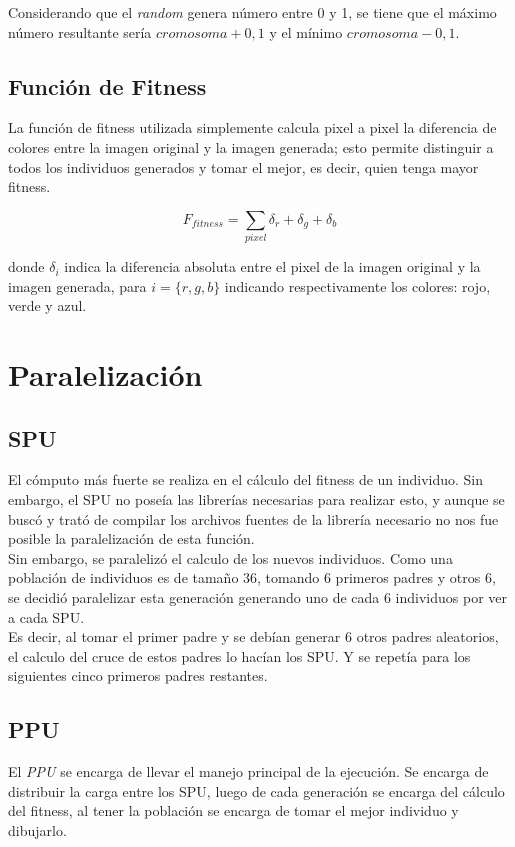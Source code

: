 \documentclass[11pt, spanish]{article}
\begin{document}
Considerando que el \emph{random} genera número entre 0 y 1, se tiene que el máximo número resultante sería $cromosoma + 0,1$ y el mínimo $cromosoma - 0,1$.

\subsection{Función de Fitness}
La función de fitness utilizada simplemente calcula pixel a pixel la diferencia de colores entre la imagen original y la imagen generada; esto permite distinguir a todos los individuos generados y tomar el mejor, es decir, quien tenga mayor fitness.

$$ F_{fitness} = \displaystyle\sum_{pixel} \delta_r + \delta_g + \delta_b $$

donde $\delta_i$ indica la diferencia absoluta entre el pixel de la imagen original y la imagen generada, para $i = \{r, g, b\}$ indicando respectivamente los colores: rojo, verde y azul.

\section{Paralelización}
\subsection{SPU}
El cómputo más fuerte se realiza en el cálculo del fitness de un individuo. Sin embargo, el SPU no poseía las librerías necesarias para realizar esto, y aunque se buscó y trató de compilar los archivos fuentes de la librería necesario no nos fue posible la paralelización de esta función. \\

Sin embargo, se paralelizó el calculo de los nuevos individuos. Como una población de individuos es de tamaño 36, tomando 6 primeros padres y otros 6, se decidió paralelizar esta generación generando uno de cada 6 individuos por ver a cada SPU. \\

Es decir, al tomar el primer padre y se debían generar 6 otros padres aleatorios, el calculo del cruce de estos padres lo hacían los SPU. Y se repetía para los siguientes cinco primeros padres restantes.

\subsection{PPU}
El \emph{PPU} se encarga de llevar el manejo principal de la ejecución. Se encarga de distribuir la carga entre los SPU, luego de cada generación se encarga del cálculo del fitness, al tener la población se encarga de tomar el mejor individuo y dibujarlo. \\
\end{document}
